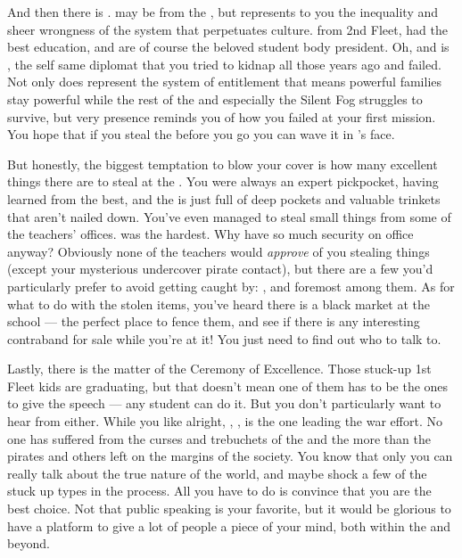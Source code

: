 \documentclass[char]{GL2020}
\begin{document}
And then there is \cPresident{\full}. \cPresident{\they} may be from the \pShip{}, but represents to you the inequality and sheer wrongness of the system that perpetuates \pShippie{} culture.  \cPresident{\They} \cPresident{\are} from 2nd Fleet, had the best education, and are of course the beloved student body president. Oh, and \cPresident{\their} \cPresident{\auncle} is \cHeadDiplomat{}, the self same diplomat that you tried to kidnap all those years ago and failed.  Not only does \cPresident{} represent the system of entitlement that means powerful families stay powerful while the rest of the \pShip{} and especially the Silent Fog struggles to survive, but \cPresident{\their} very presence reminds you of how you failed at your first mission. You hope that if you steal the \iNet{} before you go you can wave it in \cPresident{}’s face.  

But honestly, the biggest temptation to blow your cover is how many excellent things there are to steal at the \pSc{}. You were always an expert pickpocket, having learned from the best, and the \pSc{} is just full of deep pockets and valuable trinkets that aren't nailed down. You've even managed to steal small things from some of the teachers' offices. \cChupInventor{\full} was the hardest. Why \cChupInventor{\do} \cChupInventor{\they} have so much security on \cChupInventor{\their} office anyway? Obviously none of the teachers would \emph{approve} of you stealing things (except your mysterious undercover pirate contact), but there are a few you’d particularly prefer to avoid getting caught by: \cFlowPriest{}, \cInterpol{\full} and \cPrincipal{\full} foremost among them. As for what to do with the stolen items, you've heard there is a black market at the school — the perfect place to fence them, and see if there is any interesting contraband for sale while you're at it! You just need to find out who to talk to.

Lastly, there is the matter of the Ceremony of Excellence. Those stuck-up 1st Fleet kids are graduating, but that doesn't mean one of them has to be the ones to give the speech — any student can do it. But you don't particularly want to hear from \cWarlordDaughter{\full} either. While you like \cWarlordDaughter{} alright, \cWarlordDaughter{\their} \cLoud{\parent}, \cLoud{\full}, is the one leading the war effort. No one has suffered from the curses and trebuchets of the \pFarm{} and the \pTech{} more than the pirates and others left on the margins of the \pShip{} society. You know that only you can really talk about the true nature of the world, and maybe shock a few of the stuck up types in the process. All you have to do is convince \cMusic{\full} that you are the best choice. Not that public speaking is your favorite, but it would be glorious to have a platform to give a lot of people a piece of your mind, both within the \pShippies{} and beyond.
\end{document}
